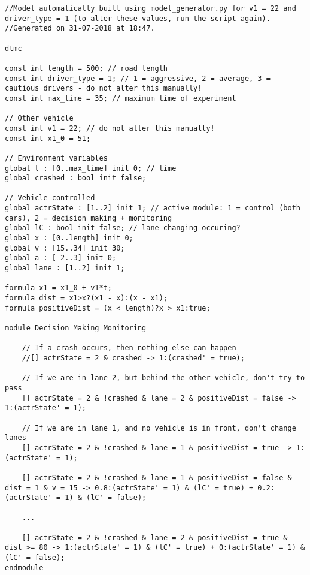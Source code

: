 {\vspace{1em}
\begin{lstlisting}[caption={Example of the model generated for the tuple $(d_{type}, v, v_1, x_{1,0}) = (1,30,22,51)$ (shortned)},captionpos=b,label={lst:model_example}]
//Model automatically built using model_generator.py for v1 = 22 and driver_type = 1 (to alter these values, run the script again).
//Generated on 31-07-2018 at 18:47.

dtmc

const int length = 500; // road length
const int driver_type = 1; // 1 = aggressive, 2 = average, 3 = cautious drivers - do not alter this manually!
const int max_time = 35; // maximum time of experiment

// Other vehicle
const int v1 = 22; // do not alter this manually!
const int x1_0 = 51;

// Environment variables
global t : [0..max_time] init 0; // time 
global crashed : bool init false; 

// Vehicle controlled
global actrState : [1..2] init 1; // active module: 1 = control (both cars), 2 = decision making + monitoring
global lC : bool init false; // lane changing occuring? 
global x : [0..length] init 0;
global v : [15..34] init 30;
global a : [-2..3] init 0;
global lane : [1..2] init 1;

formula x1 = x1_0 + v1*t;
formula dist = x1>x?(x1 - x):(x - x1);
formula positiveDist = (x < length)?x > x1:true;

module Decision_Making_Monitoring

 	// If a crash occurs, then nothing else can happen
	//[] actrState = 2 & crashed -> 1:(crashed' = true);

 	// If we are in lane 2, but behind the other vehicle, don't try to pass
	[] actrState = 2 & !crashed & lane = 2 & positiveDist = false -> 1:(actrState' = 1);

	// If we are in lane 1, and no vehicle is in front, don't change lanes
	[] actrState = 2 & !crashed & lane = 1 & positiveDist = true -> 1:(actrState' = 1);

	[] actrState = 2 & !crashed & lane = 1 & positiveDist = false & dist = 1 & v = 15 -> 0.8:(actrState' = 1) & (lC' = true) + 0.2:(actrState' = 1) & (lC' = false);

	...

	[] actrState = 2 & !crashed & lane = 2 & positiveDist = true & dist >= 80 -> 1:(actrState' = 1) & (lC' = true) + 0:(actrState' = 1) & (lC' = false);
endmodule


\end{lstlisting}}
